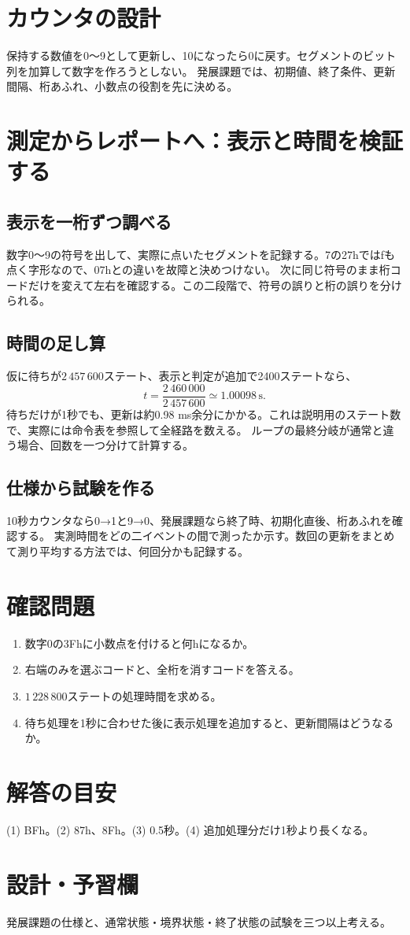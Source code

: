 \documentclass[lualatex,a4paper,10pt]{jlreq}
\begin{document}
\section{カウンタの設計}\label{sec:auto6}
保持する数値を0〜9として更新し、10になったら0に戻す。セグメントのビット列を加算して数字を作ろうとしない。
発展課題では、初期値、終了条件、更新間隔、桁あふれ、小数点の役割を先に決める。
\section{測定からレポートへ：表示と時間を検証する}\label{sec:auto7}
\subsection{表示を一桁ずつ調べる}
数字0〜9の符号を出して、実際に点いたセグメントを記録する。7の27hではfも点く字形なので、07hとの違いを故障と決めつけない。
次に同じ符号のまま桁コードだけを変えて左右を確認する。この二段階で、符号の誤りと桁の誤りを分けられる。
\subsection{時間の足し算}
仮に待ちが$2\,457\,600$ステート、表示と判定が追加で2400ステートなら、
\[
 t=\frac{2\,460\,000}{2\,457\,600}\simeq1.00098\,\mathrm{s}.
\]
待ちだけが1秒でも、更新は約0.98 ms余分にかかる。これは説明用のステート数で、実際には命令表を参照して全経路を数える。
ループの最終分岐が通常と違う場合、回数を一つ分けて計算する。
\subsection{仕様から試験を作る}
10秒カウンタなら0→1と9→0、発展課題なら終了時、初期化直後、桁あふれを確認する。
実測時間をどの二イベントの間で測ったか示す。数回の更新をまとめて測り平均する方法では、何回分かも記録する。

\clearpage
\section{確認問題}\label{sec:auto8}
\begin{enumerate}
\item 数字0の3Fhに小数点を付けると何hになるか。\answerline
\item 右端のみを選ぶコードと、全桁を消すコードを答える。\answerline
\item $1\,228\,800$ステートの処理時間を求める。\answerline
\item 待ち処理を1秒に合わせた後に表示処理を追加すると、更新間隔はどうなるか。\answerline
\end{enumerate}
\section*{解答の目安}\label{sec:auto9}
(1) BFh。(2) 87h、8Fh。(3) 0.5秒。(4) 追加処理分だけ1秒より長くなる。
\section*{設計・予習欄}\label{sec:auto10}
発展課題の仕様と、通常状態・境界状態・終了状態の試験を三つ以上考える。
\writing{26mm}
\prelabclosing
\end{document}
